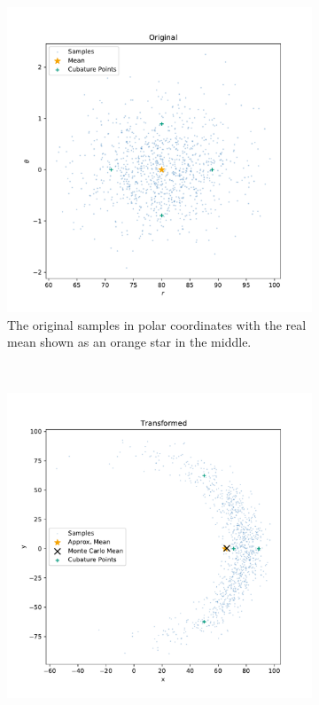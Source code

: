 	\begin{figure}
		\centering
		\begin{subfigure}[t]{0.5\linewidth}
			\centering
			\includegraphics[width = \linewidth]{figures/inference/cubature/spherical-radial-cubature-original}
			\caption{The original samples in polar coordinates with the real mean shown as an orange star in the middle.}
		\end{subfigure}%
		~
		\begin{subfigure}[t]{0.5\linewidth}
			\centering
			\includegraphics[width = \linewidth]{figures/inference/cubature/spherical-radial-cubature-transformed}

\end{subfigure}
\end{figure}
